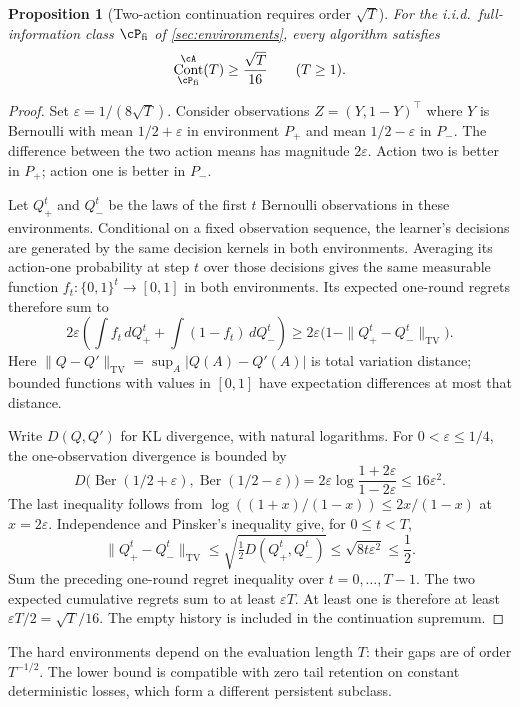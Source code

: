 \documentclass[11pt,twoside]{article}
\newcommand{\KL}{D}
\newcommand{\TV}{\mathrm{TV}}
\newtheorem{proposition}[theorem]{Proposition}
\theoremstyle{definition}
\theoremstyle{remark}
\DeclareMathOperator{\Cont}{Cont}
\begin{document}
\begin{proposition}[Two-action continuation requires order \texorpdfstring{$\sqrt T$}{sqrt(T)}]
\label{prop:lower}
For the i.i.d.\ full-information class $\cP_{\rm fi}$ of
\cref{sec:environments}, every algorithm satisfies
\[
 \Cont_{\cP_{\rm fi}}^\cA(T)\ge\frac{\sqrt T}{16}
 \qquad(T\ge1).
\]
\end{proposition}
\begin{proof}
Set $\varepsilon=1/(8\sqrt T)$. Consider observations
$Z=(Y,1-Y)^\top$ where $Y$ is Bernoulli with mean $1/2+\varepsilon$
in environment $P_+$ and mean $1/2-\varepsilon$ in $P_-$.
The difference between the two action means has magnitude $2\varepsilon$.
Action two is better in $P_+$; action one is better in $P_-$.

Let $Q_+^t$ and $Q_-^t$ be the laws of the first $t$ Bernoulli observations
in these environments. Conditional on a fixed observation sequence, the
learner's decisions are generated by the same decision kernels in both
environments. Averaging its action-one probability at step $t$ over those
decisions gives the same measurable function $f_t:\{0,1\}^t\to[0,1]$
in both environments. Its expected
one-round regrets therefore sum to
\[
 2\varepsilon\left(\int f_t\,dQ_+^t+\int(1-f_t)\,dQ_-^t\right)
 \ge2\varepsilon\bigl(1-\|Q_+^t-Q_-^t\|_{\TV}\bigr).
\]
Here $\|Q-Q'\|_{\TV}=\sup_A|Q(A)-Q'(A)|$ is total variation distance;
bounded functions with values in $[0,1]$ have expectation differences at
most that distance.

Write $\KL(Q,Q')$ for KL divergence, with natural logarithms.
For $0<\varepsilon\le1/4$, the one-observation divergence is bounded by
\[
 \KL\bigl(\operatorname{Ber}(1/2+\varepsilon),
          \operatorname{Ber}(1/2-\varepsilon)\bigr)
 =2\varepsilon\log\frac{1+2\varepsilon}{1-2\varepsilon}
 \le16\varepsilon^2.
\]
The last inequality follows from
$\log((1+x)/(1-x))\le2x/(1-x)$ at $x=2\varepsilon$.
Independence and Pinsker's inequality give, for $0\le t<T$,
\[
 \|Q_+^t-Q_-^t\|_{\TV}
 \le\sqrt{\tfrac12\KL(Q_+^t,Q_-^t)}
 \le\sqrt{8t\varepsilon^2}\le\frac12.
\]
Sum the preceding one-round regret inequality over $t=0,\ldots,T-1$.
The two expected cumulative regrets sum to at least
$\varepsilon T$. At least one is therefore at least
$\varepsilon T/2=\sqrt T/16$.
The empty history is included in the continuation supremum.
\end{proof}

The hard environments depend on the evaluation length $T$: their gaps
are of order $T^{-1/2}$. The lower bound is compatible with zero tail
retention on constant deterministic losses, which form a different
persistent subclass.
\end{document}
